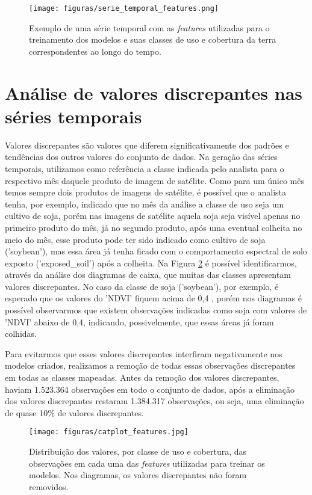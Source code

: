 \begin{figure}[H]
\caption{Exemplo de uma série temporal com as \textit{features} utilizadas para o treinamento dos modelos e suas classes de uso e cobertura da terra correspondentes ao longo do tempo.}
\label{fig:features_na_serie_temporal}
\centering
\texttt{[image: figuras/serie\_temporal\_features.png]}
\end{figure}

\section{Análise de valores discrepantes nas séries temporais}

Valores discrepantes são valores que diferem significativamente dos padrões e tendências dos outros valores do conjunto de dados. Na geração das séries temporais, utilizamos como referência a classe indicada pelo analista para o respectivo mês daquele produto de imagem de satélite. Como para um único mês temos sempre dois produtos de imagens de satélite, é possível que o analista tenha, por exemplo, indicado que no mês da análise a classe de uso seja um cultivo de soja, porém nas imagens de satélite aquela soja seja visível apenas no primeiro produto do mês, já no segundo produto, após uma eventual colheita no meio do mês, esse produto pode ter sido indicado como cultivo de soja ('soybean'), mas essa área já tenha ficado com o comportamento espectral de solo exposto ('exposed\_soil') após a colheita. Na Figura \ref{fig:boxplot_das_features_com_outliers} é possível identificarmos, através da análise dos diagramas de caixa, que muitas das classes apresentam valores discrepantes. No caso da classe de soja ('soybean'), por exemplo, é esperado que os valores do 'NDVI' fiquem acima de 0,4 \cite{risso2009potencialidade}, porém nos diagramas é possível observarmos que existem observações indicadas como soja com valores de 'NDVI' abaixo de 0,4, indicando, possivelmente, que essas áreas já foram colhidas. 

Para evitarmos que esses valores discrepantes interfiram negativamente nos modelos criados, realizamos a remoção de todas essas observações discrepantes em todas as classes mapeadas. Antes da remoção dos valores discrepantes, haviam 1.523.364 observações em todo o conjunto de dados, após a eliminação dos valores discrepantes restaram 1.384.317 observações, ou seja, uma eliminação de quase 10\% de valores discrepantes.

\begin{figure}[H]
\caption{Distribuição dos valores, por classe de uso e cobertura, das observações em cada uma das \textit{features} utilizadas para treinar os modelos. Nos diagramas, os valores discrepantes não foram removidos.}
\label{fig:boxplot_das_features_com_outliers}
\centering
\texttt{[image: figuras/catplot\_features.jpg]}
\end{figure}

